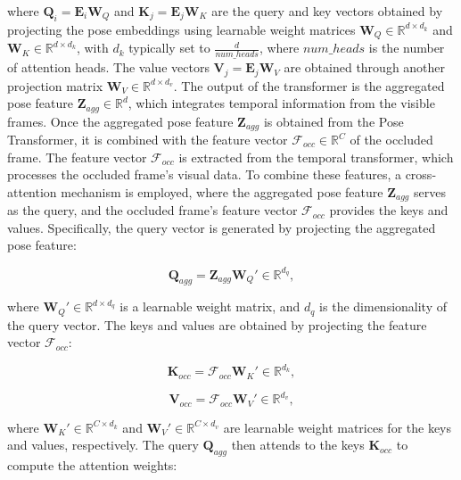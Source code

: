 \noindent where \( \mathbf{Q}_i = \mathbf{E}_i \mathbf{W}_Q \) and \( \mathbf{K}_j = \mathbf{E}_j \mathbf{W}_K \) are the query and key vectors obtained by projecting the pose embeddings using learnable weight matrices \( \mathbf{W}_Q \in \mathbb{R}^{d \times d_k} \) and \( \mathbf{W}_K \in \mathbb{R}^{d \times d_k} \), with \( d_k \) typically set to \( \frac{d}{num\_heads} \), where \( num\_heads \) is the number of attention heads. The value vectors \( \mathbf{V}_j = \mathbf{E}_j \mathbf{W}_V \) are obtained through another projection matrix \( \mathbf{W}_V \in \mathbb{R}^{d \times d_v} \). The output of the transformer is the aggregated pose feature \( \mathbf{Z}_{agg} \in \mathbb{R}^d \), which integrates temporal information from the visible frames. Once the aggregated pose feature \( \mathbf{Z}_{agg} \) is obtained from the Pose Transformer, it is combined with the feature vector \( \mathcal{F}_{occ} \in \mathbb{R}^C \) of the occluded frame. The feature vector \( \mathcal{F}_{occ} \) is extracted from the temporal transformer, which processes the occluded frame's visual data. To combine these features, a cross-attention mechanism is employed, where the aggregated pose feature \( \mathbf{Z}_{agg} \) serves as the query, and the occluded frame's feature vector \( \mathcal{F}_{occ} \) provides the keys and values. Specifically, the query vector is generated by projecting the aggregated pose feature:

\begin{equation}
    \mathbf{Q}_{agg} = \mathbf{Z}_{agg} \mathbf{W}_Q' \in \mathbb{R}^{d_q},
\end{equation}

\noindent where \( \mathbf{W}_Q' \in \mathbb{R}^{d \times d_q} \) is a learnable weight matrix, and \( d_q \) is the dimensionality of the query vector. The keys and values are obtained by projecting the feature vector \( \mathcal{F}_{occ} \):

\begin{equation}
    \mathbf{K}_{occ} = \mathcal{F}_{occ} \mathbf{W}_K' \in \mathbb{R}^{d_k},
\end{equation}

\begin{equation}
    \mathbf{V}_{occ} = \mathcal{F}_{occ} \mathbf{W}_V' \in \mathbb{R}^{d_v},
\end{equation}

\noindent where \( \mathbf{W}_K' \in \mathbb{R}^{C \times d_k} \) and \( \mathbf{W}_V' \in \mathbb{R}^{C \times d_v} \) are learnable weight matrices for the keys and values, respectively. The query \( \mathbf{Q}_{agg} \) then attends to the keys \( \mathbf{K}_{occ} \) to compute the attention weights:

